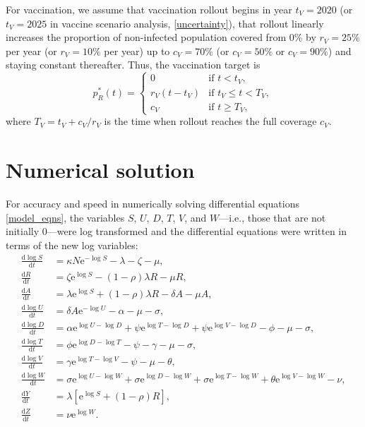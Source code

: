 \documentclass{article}
\newcommand{\md}{\mathrm{d}}
\newcommand{\me}{\mathrm{e}}
\begin{document}
For vaccination, we assume that vaccination rollout begins in year
$t_V = 2020$ (or $t_V = 2025$ in vaccine scenario analysis,
\autoref{uncertainty}), that rollout linearly increases the proportion
of non-infected population covered from 0\% by $r_V = 25\%$ per year
(or $r_V = 10\%$ per year) up to $c_V = 70\%$ (or $c_V = 50\%$ or
$c_V = 90\%$) and staying constant thereafter.  Thus, the vaccination
target is
\begin{equation}
  \label{vaccination_target}
  p_R^*(t) =
  \begin{cases}
    0 & \text{if $t < t_V$},
    \\
    r_V (t - t_V) & \text{if $t_V \leq t < T_V$},
    \\
    c_V & \text{if $t \geq T_V$},
  \end{cases}
\end{equation}
where $T_V = t_V + c_V / r_V$ is the time when rollout reaches
the full coverage $c_V$.


\section{Numerical solution}

For accuracy and speed in numerically solving differential equations
\eqref{model_eqns}, the variables $S$, $U$, $D$, $T$, $V$, and
$W$---i.e., those that are not initially $0$---were log transformed
and the differential equations were written in terms of
the new log variables:
\begin{equation}
  \label{model_eqns_log}
  \begin{split}
    \frac{\md \log S}{\md t} &= \kappa N \me^{- \log S} - \lambda - \zeta - \mu,
    \\
    \frac{\md R}{\md t} & = \zeta \me^{\log S} - (1 - \rho) \lambda R - \mu R,
    \\
    \frac{\md A}{\md t} &= \lambda \me^{\log S} + (1 - \rho) \lambda R
    - \delta A - \mu A,
    \\
    \frac{\md \log U}{\md t} &= \delta A \me^{- \log U} - \alpha - \mu - \sigma,
    \\
    \frac{\md \log D}{\md t} &=  \alpha \me^{\log U - \log D}
    + \psi \me^{\log T - \log D} + \psi \me^{\log V - \log D} - \phi - \mu - \sigma,
    \\
    \frac{\md \log T}{\md t} &= \phi \me^{\log D - \log T} - \psi - \gamma - \mu
    - \sigma,
    \\
    \frac{\md \log V}{\md t} &= \gamma \me^{\log T - \log V} - \psi
    - \mu  - \theta,
    \\
    \frac{\md \log W}{\md t} &= \sigma \me^{\log U - \log W}
    + \sigma \me^{\log D - \log W} + \sigma \me^{\log T - \log W}
    + \theta \me^{\log V - \log W} - \nu,
    \\
    \frac{\md Y}{\md t} &= \lambda \left[\me^{\log S} + (1 - \rho) R\right],
    \\
    \frac{\md Z}{\md t} &= \nu \me^{\log W}.
  \end{split}
\end{equation}
\end{document}
